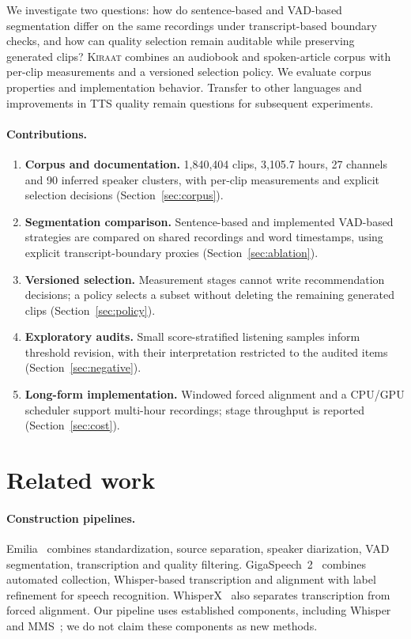 \documentclass[11pt,a4paper]{article}
\begin{document}
We investigate two questions: how do sentence-based and VAD-based segmentation
differ on the same recordings under transcript-based boundary checks, and how
can quality selection remain auditable while preserving generated clips?
\textsc{Kiraat} combines an audiobook and spoken-article corpus with per-clip
measurements and a versioned selection policy. We evaluate corpus properties
and implementation behavior. Transfer to other languages and improvements in
TTS quality remain questions for subsequent experiments.

\paragraph{Contributions.}
\begin{enumerate}
\item \textbf{Corpus and documentation.} 1,840,404 clips, 3,105.7 hours,
27 channels and 90 inferred speaker clusters, with per-clip measurements
and explicit selection decisions (Section~\ref{sec:corpus}).
\item \textbf{Segmentation comparison.} Sentence-based and implemented
VAD-based strategies are compared on shared recordings and word timestamps,
using explicit transcript-boundary proxies (Section~\ref{sec:ablation}).
\item \textbf{Versioned selection.} Measurement stages cannot write
recommendation decisions; a policy selects a subset without deleting the
remaining generated clips (Section~\ref{sec:policy}).
\item \textbf{Exploratory audits.} Small score-stratified listening samples
inform threshold revision, with their interpretation restricted to the audited
items (Section~\ref{sec:negative}).
\item \textbf{Long-form implementation.} Windowed forced alignment and a
CPU/GPU scheduler support multi-hour recordings; stage throughput is reported
(Section~\ref{sec:cost}).
\end{enumerate}

\section{Related work}
\paragraph{Construction pipelines.}
Emilia~\cite{emilia,emilialarge} combines standardization, source separation,
speaker diarization, VAD segmentation, transcription and quality filtering.
GigaSpeech~2~\cite{gigaspeech2} combines automated collection, Whisper-based
transcription and alignment with label refinement for speech recognition.
WhisperX~\cite{whisperx} also separates transcription from forced alignment.
Our pipeline uses established components, including Whisper~\cite{whisper}
and MMS~\cite{mms}; we do not claim these components as new methods.
\end{document}
